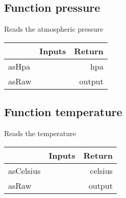 \documentclass[a4paper,12pt,oneside,pdflatex,italian,final,twocolumn]{article}
\begin{document}
\raggedright
\subsection{Function pressure }
Reads the atmospheric pressure \\

\centering
\begin{tabular}{lcr}
\toprule
  & Inputs & Return \\
\midrule
asHpa &
&
hpa
\\
asRaw &
&
output
\\
\bottomrule
\end{tabular}



\raggedright
\subsection{Function temperature }
Reads the temperature \\

\centering
\begin{tabular}{lcr}
\toprule
  & Inputs & Return \\
\midrule
asCelsius &
&
celsius
\\
asRaw &
&
output
\\
\bottomrule
\end{tabular}



\raggedright
\end{document}
